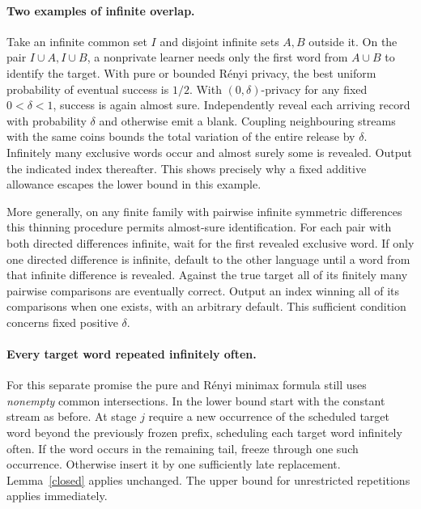 \documentclass[11pt]{article}
\begin{document}
\paragraph{Two examples of infinite overlap.}
Take an infinite common set $I$ and disjoint infinite sets $A,B$ outside it. On the pair $I\cup A,I\cup B$, a nonprivate learner needs only the first word from $A\cup B$ to identify the target. With pure or bounded R\'enyi privacy, the best uniform probability of eventual success is $1/2$. With $(0,\delta)$-privacy for any fixed $0<\delta<1$, success is again almost sure. Independently reveal each arriving record with probability $\delta$ and otherwise emit a blank. Coupling neighbouring streams with the same coins bounds the total variation of the entire release by $\delta$. Infinitely many exclusive words occur and almost surely some is revealed. Output the indicated index thereafter. This shows precisely why a fixed additive allowance escapes the lower bound in this example.

More generally, on any finite family with pairwise infinite symmetric differences this thinning procedure permits almost-sure identification. For each pair with both directed differences infinite, wait for the first revealed exclusive word. If only one directed difference is infinite, default to the other language until a word from that infinite difference is revealed. Against the true target all of its finitely many pairwise comparisons are eventually correct. Output an index winning all of its comparisons when one exists, with an arbitrary default. This sufficient condition concerns fixed positive $\delta$.

\paragraph{Every target word repeated infinitely often.}
For this separate promise the pure and R\'enyi minimax formula still uses \emph{nonempty} common intersections. In the lower bound start with the constant stream as before. At stage $j$ require a new occurrence of the scheduled target word beyond the previously frozen prefix, scheduling each target word infinitely often. If the word occurs in the remaining tail, freeze through one such occurrence. Otherwise insert it by one sufficiently late replacement. Lemma~\ref{closed} applies unchanged. The upper bound for unrestricted repetitions applies immediately.
\end{document}
